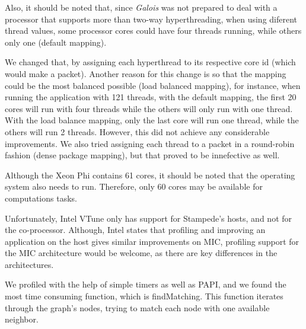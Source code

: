 \documentclass[abstract=on,9pt,twocolumn]{scrartcl}
\begin{document}
Also, it should be noted that, since \textit{Galois} was not prepared to deal with a processor that supports more than two-way hyperthreading, when using diferent thread values, some processor cores could have four threads running, while others only one (default mapping).

We changed that, by assigning each hyperthread to its respective core id (which would make a packet).
Another reason for this change is so that the mapping could be
the most balanced possible (load balanced mapping), for instance,
when running the application with 121 threads, with the default mapping,
the first 20 cores will run with four threads while the others will only
run with one thread. With the load balance mapping, only the last core
will run one thread, while the others will run 2 threads. However, this did not achieve any considerable improvements. We also tried assigning each thread to a packet in a round-robin fashion (dense package mapping), but that proved to be innefective as well.

Although the Xeon Phi contains 61 cores, it should be noted that the
operating system also needs to run. Therefore, only 60 cores may be
available for computations tasks.



Unfortunately, Intel VTune only has support for Stampede's hosts, and
not for the co-processor. Although, Intel states that profiling and
improving an application on the host gives similar improvements on MIC,
profiling support for the MIC architecture would be welcome, as there are key
differences in the architectures.

We profiled with the help of simple timers as well as PAPI, and we
found the most time consuming function, which is findMatching. This
function iterates through the graph's nodes, trying to match each node
with one available neighbor.

\end{document}
